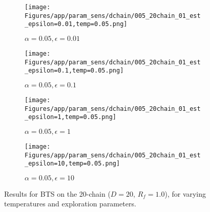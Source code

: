\documentclass{article}
\theoremstyle{plain}
\begin{document}
\begin{appendices}
\begin{figure}
                \begin{subfigure}[b]{0.24\textwidth}
                    \centering
                    \texttt{[image: Figures/app/param\_sens/dchain/005\_20chain\_01\_est\_epsilon=0.01,temp=0.05.png]}
                    \caption*{$\alpha=0.05,\epsilon=0.01$}
                \end{subfigure}
                \begin{subfigure}[b]{0.24\textwidth}
                    \centering
                    \texttt{[image: Figures/app/param\_sens/dchain/005\_20chain\_01\_est\_epsilon=0.1,temp=0.05.png]}
                    \caption*{$\alpha=0.05,\epsilon=0.1$}
                \end{subfigure}
                \begin{subfigure}[b]{0.24\textwidth}
                    \centering
                    \texttt{[image: Figures/app/param\_sens/dchain/005\_20chain\_01\_est\_epsilon=1,temp=0.05.png]}
                    \caption*{$\alpha=0.05,\epsilon=1$}
                \end{subfigure}
                \begin{subfigure}[b]{0.24\textwidth}
                    \centering
                    \texttt{[image: Figures/app/param\_sens/dchain/005\_20chain\_01\_est\_epsilon=10,temp=0.05.png]}
                    \caption*{$\alpha=0.05,\epsilon=10$}
                \end{subfigure}
                
                \caption{Results for BTS on the 20-chain ($D=20$, $R_f=1.0$), for varying temperatures and exploration parameters.}
                \label{fig:bts_20chain_hps}
            \end{figure}


            \begin{figure}
                \centering
                

\end{figure}
\end{appendices}
\end{document}

